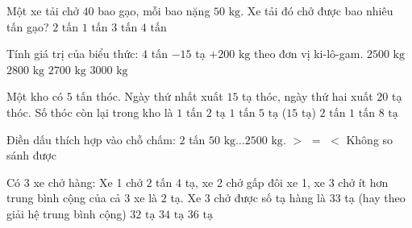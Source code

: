 \begin{ex} %
Một xe tải chở $40$ bao gạo, mỗi bao nặng $50\text{ kg}$. Xe tải đó chở được bao nhiêu tấn gạo?
\choice
{\True $2\text{ tấn}$}
{$1\text{ tấn}$}
{$3\text{ tấn}$}
{$4\text{ tấn}$}
\end{ex}

\begin{ex} %
Tính giá trị của biểu thức: $4$ tấn $- 15$ tạ $+ 200\text{ kg}$ theo đơn vị ki-lô-gam.
\choice
{$2500\text{ kg}$}
{$2800\text{ kg}$}
{\True $2700\text{ kg}$}
{$3000\text{ kg}$}
\end{ex}

\begin{ex} %
Một kho có $5$ tấn thóc. Ngày thứ nhất xuất $15$ tạ thóc, ngày thứ hai xuất $20$ tạ thóc. Số thóc còn lại trong kho là
\choice
{$1\text{ tấn } 2\text{ tạ}$}
{\True $1\text{ tấn } 5\text{ tạ}$ ($15\text{ tạ}$)}
{$2\text{ tấn}$}
{$1\text{ tấn } 8\text{ tạ}$}
\end{ex}

\begin{ex} %
Điền dấu thích hợp vào chỗ chấm: $2$ tấn $50\text{ kg} \dots 2500\text{ kg}$.
\choice
{$>$}
{$=$}
{\True $<$}
{Không so sánh được}
\end{ex}

\begin{ex} %
Có 3 xe chở hàng: Xe 1 chở $2$ tấn $4$ tạ, xe 2 chở gấp đôi xe 1, xe 3 chở ít hơn trung bình cộng của cả 3 xe là $2$ tạ. Xe 3 chở được số tạ hàng là
\choice
{\True $33$ tạ (hay theo giải hệ trung bình cộng)}
{$32\text{ tạ}$}
{$34\text{ tạ}$}
{$36\text{ tạ}$}
\end{ex}


